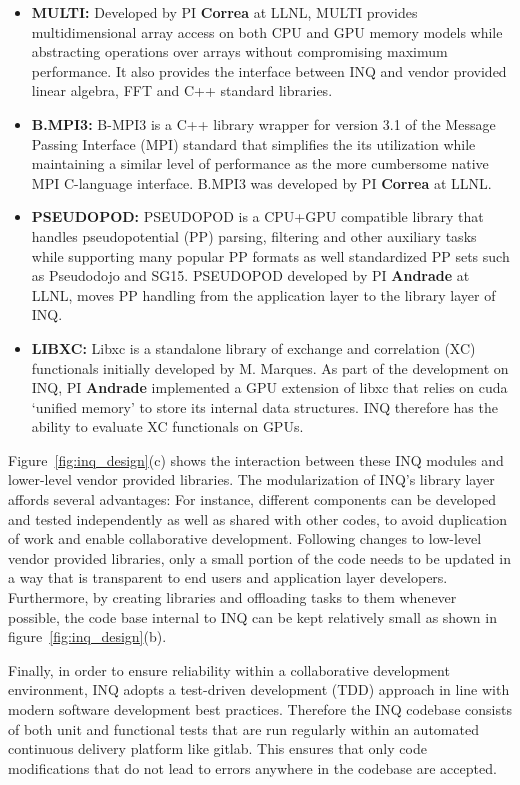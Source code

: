 \begin{itemize}
    \item \textbf{MULTI:} Developed by PI \textbf{Correa} at LLNL, \textsc{MULTI} provides multidimensional array access on both CPU and GPU memory models while abstracting operations over arrays without compromising maximum performance. It also provides the interface between \textsc{INQ} and vendor provided linear algebra, FFT and C++ standard libraries.
    \item \textbf{B.MPI3:} B-MPI3 is a C++ library wrapper for version 3.1 of the Message Passing Interface (MPI) standard that simplifies the its utilization while maintaining a similar level of performance as the more cumbersome native MPI C-language interface. B.MPI3 was developed by PI \textbf{Correa} at LLNL.
    \item \textbf{PSEUDOPOD:} \textsc{PSEUDOPOD} is a CPU+GPU compatible library that handles pseudopotential (PP) parsing, filtering and other auxiliary tasks while supporting many popular PP formats as well standardized PP sets such as Pseudodojo and SG15. \textsc{PSEUDOPOD} developed by PI \textbf{Andrade} at LLNL, moves PP handling from the application layer to the library layer of INQ.
    \item \textbf{LIBXC:} Libxc is a standalone library of exchange and correlation (XC) functionals initially developed by M. Marques. As part of the development on \textsc{INQ}, PI \textbf{Andrade} implemented a GPU extension of libxc that relies on cuda ‘unified memory’ to store its internal data structures. \textsc{INQ} therefore has the ability to evaluate XC functionals on GPUs.  
\end{itemize}
Figure~\ref{fig:inq_design}(c) shows the interaction between these \textsc{INQ} modules and lower-level vendor provided libraries.  The modularization of \textsc{INQ}'s library layer affords several advantages: For instance, different components can be developed and tested independently as well as shared with other codes, to avoid duplication of work and enable collaborative development. Following changes to low-level vendor provided libraries, only a small portion of the code needs to be updated in a way that is transparent to end users and application layer developers. Furthermore, by creating libraries and offloading tasks to them whenever possible, the code base internal to \textsc{INQ} can be kept relatively small as shown in figure~\ref{fig:inq_design}(b). 

Finally, in order to ensure reliability within a collaborative development environment,  \textsc{INQ} adopts a test-driven development (TDD) approach in line with modern software development best practices. Therefore the \textsc{INQ} codebase consists of both unit and functional tests that are run regularly within an automated continuous delivery platform like gitlab. This ensures that only code modifications that do not lead to errors anywhere in the codebase are accepted.

